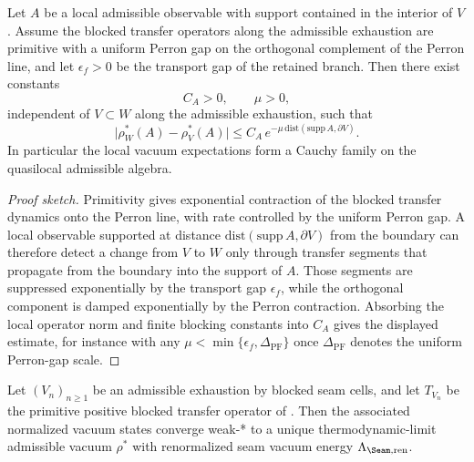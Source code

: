 \begin{lemma}
\label{lem:boundary-decoupling-admissible}
Let $A$ be a local admissible observable with support contained in the interior of $V$. Assume the
blocked transfer operators along the admissible exhaustion are primitive with a uniform Perron gap
on the orthogonal complement of the Perron line, and let $\epsilon_f>0$ be the transport gap of the
retained branch. Then there exist constants
\[
C_A>0,
\qquad
\mu>0,
\]
independent of $V\subset W$ along the admissible exhaustion, such that
\[
\bigl|\rho_W^\ast(A)-\rho_V^\ast(A)\bigr|
\le
C_A\,e^{-\mu\,\mathrm{dist}(\mathrm{supp}\,A,\partial V)}.
\]
In particular the local vacuum expectations form a Cauchy family on the quasilocal admissible
algebra.
\end{lemma}

\begin{proof}[Proof sketch]
Primitivity gives exponential contraction of the blocked transfer dynamics onto the Perron line,
with rate controlled by the uniform Perron gap. A local observable supported at distance
$\mathrm{dist}(\mathrm{supp}\,A,\partial V)$ from the boundary can therefore detect a change from
$V$ to $W$ only through transfer segments that propagate from the boundary into the support of $A$.
Those segments are suppressed exponentially by the transport gap $\epsilon_f$, while the orthogonal
component is damped exponentially by the Perron contraction. Absorbing the local operator norm and
finite blocking constants into $C_A$ gives the displayed estimate, for instance with any
$\mu<\min\{\epsilon_f,\Delta_{\mathrm{PF}}\}$ once $\Delta_{\mathrm{PF}}$ denotes the uniform
Perron-gap scale.
\end{proof}

\begin{theorem}
\label{thm:thermodynamic-limit}
Let $(V_n)_{n\ge1}$ be an admissible exhaustion by blocked seam cells, and let $T_{V_n}$ be the
primitive positive blocked transfer operator of . Then the
associated normalized vacuum states converge weak-* to a unique thermodynamic-limit admissible
vacuum $\rho^\ast$ with renormalized seam vacuum energy $\Lambda_{\Seam,\mathrm{ren}}$.
\end{theorem}

